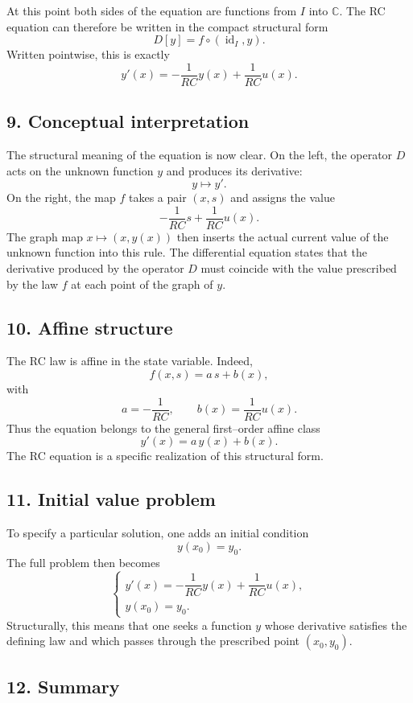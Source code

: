 \documentclass[12pt]{article}
\begin{document}
	At this point both sides of the equation are functions from \(I\) into \(\mathbb{C}\). The RC equation can therefore be written in the compact structural form
	$$
	D[y]=f\circ(\operatorname{id}_I,y).
	$$
	Written pointwise, this is exactly
	$$
	y'(x)= -\frac{1}{RC}y(x)+\frac{1}{RC}u(x).
	$$
	
	\subsection*{9. Conceptual interpretation}
	
	The structural meaning of the equation is now clear. On the left, the operator \(D\) acts on the unknown function \(y\) and produces its derivative:
	$$
	y\mapsto y'.
	$$
	On the right, the map \(f\) takes a pair \((x,s)\) and assigns the value
	$$
	-\frac{1}{RC}s+\frac{1}{RC}u(x).
	$$
	The graph map \(x\mapsto (x,y(x))\) then inserts the actual current value of the unknown function into this rule. The differential equation states that the derivative produced by the operator \(D\) must coincide with the value prescribed by the law \(f\) at each point of the graph of \(y\).
	
	\subsection*{10. Affine structure}
	
	The RC law is affine in the state variable. Indeed,
	$$
	f(x,s)=a\,s+b(x),
	$$
	with
	$$
	a=-\frac{1}{RC},
	\qquad
	b(x)=\frac{1}{RC}u(x).
	$$
	Thus the equation belongs to the general first--order affine class
	$$
	y'(x)=a\,y(x)+b(x).
	$$
	The RC equation is a specific realization of this structural form.
	
	\subsection*{11. Initial value problem}
	
	To specify a particular solution, one adds an initial condition
	$$
	y(x_0)=y_0.
	$$
	The full problem then becomes
	$$
	\begin{cases}
		y'(x)= -\dfrac{1}{RC}y(x)+\dfrac{1}{RC}u(x),\\[0.5em]
		y(x_0)=y_0.
	\end{cases}
	$$
	Structurally, this means that one seeks a function \(y\) whose derivative satisfies the defining law and which passes through the prescribed point \((x_0,y_0)\).
	
	\subsection*{12. Summary}
	
\end{document}
